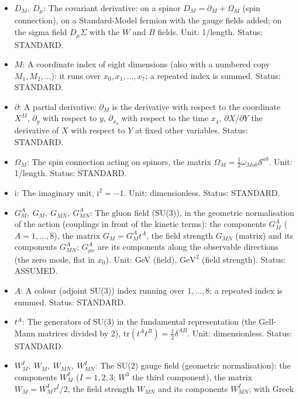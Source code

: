 \documentclass[
  10pt,
]{article}
\providecommand{\tightlist}{%
  \setlength{\itemsep}{0pt}\setlength{\parskip}{0pt}}
\begin{document}
\begin{itemize}
\tightlist
\item
  \(D_M,\ D_\mu\): The covariant derivative: on a spinor
  \(D_M = \partial_M + \Omega_M\) (spin connection), on a Standard-Model
  fermion with the gauge fields added; on the sigma field
  \(D_\mu\Sigma\) with the \(W\) and \(B\) fields. Unit: 1/length.
  Status: STANDARD.
\item
  \(M\): A coordinate index of eight dimensions (also with a numbered
  copy \(M_1, M_2, \dots\)): it runs over \(x_0, x_1, \dots, x_7\); a
  repeated index is summed. Status: STANDARD.
\item
  \(\partial\): A partial derivative: \(\partial_M\) is the derivative
  with respect to the coordinate \(X^M\), \(\partial_y\) with respect to
  \(y\), \(\partial_{x_4}\) with respect to the time \(x_4\),
  \(\partial X/\partial Y\) the derivative of \(X\) with respect to
  \(Y\) at fixed other variables. Status: STANDARD.
\item
  \(\Omega_M\): The spin connection acting on spinors, the matrix
  \(\Omega_M = \frac12\omega_{Mab}\mathcal{S}^{ab}\). Unit: 1/length.
  Status: STANDARD.
\item
  \(\mathrm{i}\): The imaginary unit, \(\mathrm{i}^2 = -1\). Unit:
  dimensionless. Status: STANDARD.
\item
  \(G^A_M,\ G_M,\ G_{MN},\ G^A_{MN}\): The gluon field (SU(3)), in the
  geometric normalisation of the action (couplings in front of the
  kinetic terms): the components \(G^A_M\) (\(A = 1, \dots, 8\)), the
  matrix \(G_M = G^A_Mt^A\), the field strength \(G_{MN}\) (matrix) and
  its components \(G^A_{MN}\); \(G^A_{\mu\nu}\) are its components along
  the observable directions (the zero mode, flat in \(x_0\)). Unit: GeV
  (field), \(\mathrm{GeV}^{2}\) (field strength). Status: ASSUMED.
\item
  \(A\): A colour (adjoint SU(3)) index running over \(1, \dots, 8\); a
  repeated index is summed. Status: STANDARD.
\item
  \(t^A\): The generators of SU(3) in the fundamental representation
  (the Gell-Mann matrices divided by 2),
  \(\mathrm{tr}(t^At^B) = \frac12\delta^{AB}\). Unit: dimensionless.
  Status: STANDARD.
\item
  \(W^I_M,\ W_M,\ W_{MN},\ W^I_{MN}\): The SU(2) gauge field (geometric
  normalisation): the components \(W^I_M\) (\(I = 1, 2, 3\); \(W^3\) the
  third component), the matrix \(W_M = W^I_M\tau^I/2\), the field
  strength \(W_{MN}\) and its components \(W^I_{MN}\); with Greek

\end{itemize}
\end{document}
